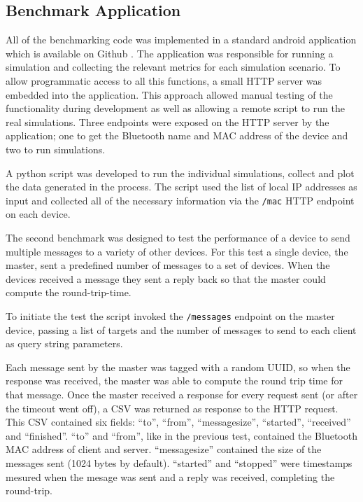 \subsection{Benchmark Application}
All of the benchmarking code was implemented in a standard android application which is available on Github \cite{benchmarking-code}.
The application was responsible for running a simulation and collecting the relevant metrics for each simulation scenario.
To allow programmatic access to all this functions, a small HTTP server \cite{nanohttpd} was embedded into the application.
This approach allowed manual testing of the functionality during development as well as allowing a remote script to run the real simulations.
Three endpoints were exposed on the HTTP server by the application; one to get the Bluetooth name and MAC address of the device and two to run simulations.

A python script was developed to run the individual simulations, collect and plot the data generated in the process.
The script used the list of local IP addresses as input and collected all of the necessary information via the \texttt{/mac} HTTP endpoint on each device.


The second benchmark was designed to test the performance of a device to send multiple messages to a variety of other devices.
For this test a single device, the master, sent a predefined number of messages to a set of devices.
When the devices received a message they sent a reply back so that the master could compute the round-trip-time.

To initiate the test the script invoked the \texttt{/messages} endpoint on the master device, passing a list of targets and the number of messages to send to each client as query string parameters.

Each message sent by the master was tagged with a random UUID, so when the response was received, the master was able to compute the round trip time for that message.
Once the master received a response for every request sent (or after the timeout went off), a CSV was returned as response to the HTTP request.
This CSV contained six fields: ``to'', ``from'', ``message\textunderscore size'', ``started'', ``received'' and ``finished''.
``to'' and ``from'', like in the previous test, contained the Bluetooth MAC address of client and server.
``message\textunderscore size'' contained the size of the messages sent (1024 bytes by default).
``started'' and ``stopped'' were timestamps mesured when the mesage was sent and a reply was received, completing the round-trip.

